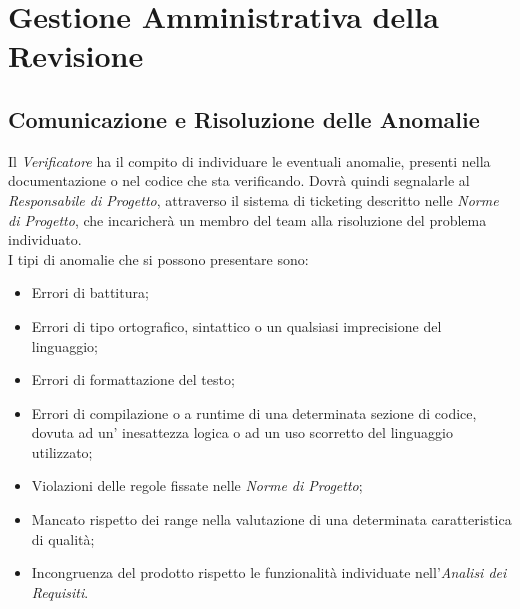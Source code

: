 \section{Gestione Amministrativa della Revisione}

\subsection{Comunicazione e Risoluzione delle Anomalie}
Il \textit{Verificatore} ha il compito di individuare le eventuali anomalie, presenti nella documentazione o nel codice che sta verificando. Dovrà quindi segnalarle al \textit{Responsabile di Progetto}, attraverso il sistema di ticketing descritto nelle \textit{Norme di Progetto}, che incaricherà un membro del team alla risoluzione del problema individuato.\\ I tipi di anomalie che si possono presentare sono:
\begin{itemize} 
\item Errori di battitura;
\item Errori di tipo ortografico, sintattico o un qualsiasi imprecisione del linguaggio; 
\item Errori di formattazione del testo;
\item Errori di compilazione o a runtime di una determinata sezione di codice, dovuta ad un' inesattezza logica o ad un uso scorretto del linguaggio utilizzato;
\item Violazioni delle regole fissate nelle \textit{Norme di Progetto}; 
\item Mancato rispetto dei range nella valutazione di una determinata caratteristica di qualità;
\item Incongruenza del prodotto rispetto le funzionalità individuate nell’\textit{Analisi dei Requisiti}.
\end{itemize}

